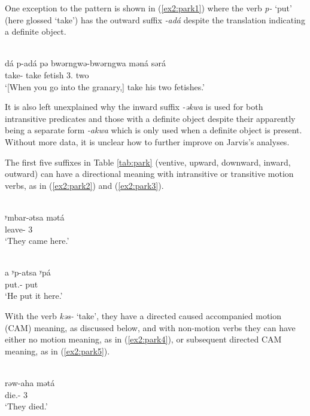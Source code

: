 One exception to the pattern is shown in (\ref{ex2:park1}) where the verb \textit{p-} `put' (here glossed `take') has the outward suffix \textit{-adá} despite the translation indicating a definite object.

\ea\label{ex2:park1}
 \\
\gll  dá p-adá pə bwərngwə-bwərngwa məná sərá	\\
 take- take fetish 3. two \\
\glt `[When you go into the granary,] take his two fetishes.'
\z 

It is also left unexplained why the inward suffix \textit{-əkwa} is used for both intransitive predicates and those with a definite object despite their apparently being a separate form \textit{-akwa} which is only used when a definite object is present. Without more data, it is unclear how to further improve on Jarvis's analyses. 

The first five suffixes in Table \ref{tab:park} (ventive, upward, downward, inward, outward) can have a directional meaning with intransitive or transitive motion verbs, as in (\ref{ex2:park2}) and (\ref{ex2:park3}). 

\ea\label{ex2:park2}
 \\
\gll   ʸmbar-ətsa mətá	\\
leave- 3	\\
\glt `They came here.'

\ex\label{ex2:park3}
 \\
\gll a ʸp-atsa ʸpá	\\
 put.- put \\
\glt `He put it here.'
\z 

With the verb \textit{kəs-} `take', they have a directed caused accompanied motion (CAM) meaning, as discussed below, and with non-motion verbs they can have either no motion meaning, as in (\ref{ex2:park4}), or subsequent directed CAM meaning, as in (\ref{ex2:park5}).  

\ea\label{ex2:park4}
 \\
\gll rəw-aha mətá	\\
die.- 3 \\
\glt `They died.'

